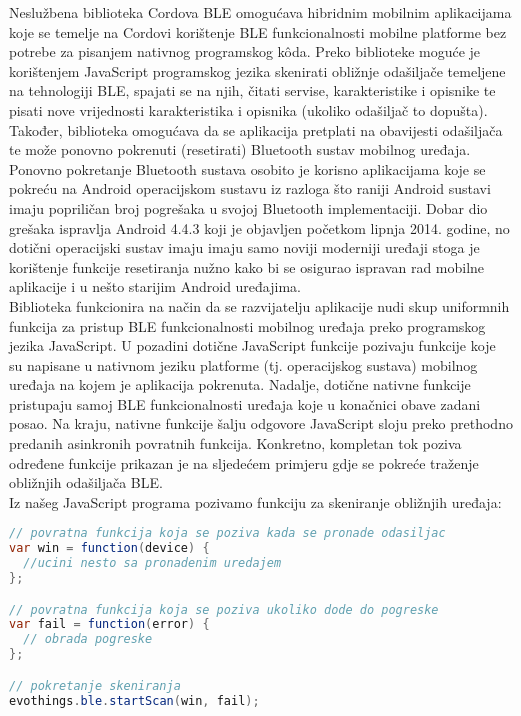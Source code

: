 Neslužbena biblioteka Cordova BLE omogućava hibridnim mobilnim aplikacijama koje se temelje na Cordovi korištenje BLE funkcionalnosti mobilne platforme bez potrebe za pisanjem nativnog programskog kôda. 
Preko biblioteke moguće je korištenjem JavaScript programskog jezika skenirati obližnje odašiljače temeljene na tehnologiji BLE, spajati se na njih, čitati servise, karakteristike i opisnike te pisati nove vrijednosti karakteristika i opisnika (ukoliko odašiljač to dopušta). 
Također, biblioteka omogućava da se aplikacija pretplati na obavijesti odašiljača te može ponovno pokrenuti (resetirati) Bluetooth sustav mobilnog uređaja. 
Ponovno pokretanje Bluetooth sustava osobito je korisno aplikacijama koje se pokreću na Android operacijskom sustavu iz razloga što raniji Android sustavi imaju popriličan broj pogrešaka u svojoj Bluetooth implementaciji. 
Dobar dio grešaka ispravlja Android 4.4.3 koji je objavljen početkom lipnja 2014. godine, no dotični operacijski sustav imaju imaju samo noviji moderniji uređaji stoga je korištenje funkcije resetiranja nužno kako bi se osigurao ispravan rad mobilne aplikacije i u nešto starijim Android uređajima.
\\

Biblioteka funkcionira na način da se razvijatelju aplikacije nudi skup uniformnih funkcija za pristup BLE funkcionalnosti mobilnog uređaja preko programskog jezika JavaScript. 
U pozadini dotične JavaScript funkcije pozivaju funkcije koje su napisane u nativnom jeziku platforme (tj. operacijskog sustava) mobilnog uređaja na kojem je aplikacija pokrenuta. 
Nadalje, dotične nativne funkcije pristupaju samoj BLE funkcionalnosti uređaja koje u konačnici obave zadani posao. 
Na kraju, nativne funkcije šalju odgovore JavaScript sloju preko prethodno predanih asinkronih povratnih  funkcija.
Konkretno, kompletan tok poziva određene funkcije prikazan je na sljedećem primjeru gdje se pokreće traženje obližnjih odašiljača BLE.
\\

Iz našeg JavaScript programa pozivamo funkciju za skeniranje obližnjih uređaja:
\begin{lstlisting}[language=java, morekeywords={var,function}]
// povratna funkcija koja se poziva kada se pronade odasiljac
var win = function(device) {
  //ucini nesto sa pronadenim uredajem
};

// povratna funkcija koja se poziva ukoliko dode do pogreske
var fail = function(error) {
  // obrada pogreske
};

// pokretanje skeniranja
evothings.ble.startScan(win, fail);
\end{lstlisting}

